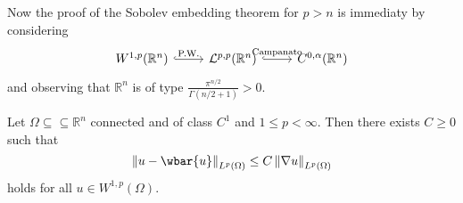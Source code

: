 Now the proof of the Sobolev embedding theorem for $p > n$ is immediaty by considering
\begin{equation*}
	\begin{tikzcd}
		W^{1,p}(\mathbb{R}^n) \arrow[r,"\text{P.W.}",hook] & \mathcal{L}^{p,p}(\mathbb{R}^n) \arrow[r,"\text{Campanato}",hook] & C^{0,\alpha}(\mathbb{R}^n)
	\end{tikzcd}
\end{equation*}
\noindent and observing that $\mathbb{R}^n$ is of type $\frac{\pi^{n/2}}{\Gamma(n/2 + 1)} > 0$.

\begin{theorem}
	\label{thm:PW}
	Let $\Omega \subseteq \subseteq \mathbb{R}^n$ connected and of class $C^1$ and $1 \leq p < \infty$. Then there exists $C \geq 0$ such that 
	\begin{equation*}
		\norm[0]{u - \wbar{u}}_{L^p(\Omega)} \leq C \norm[0]{\nabla u}_{L^p(\Omega)}
	\end{equation*}
	\noindent holds for all $u \in W^{1,p}(\Omega)$.
\end{theorem}

